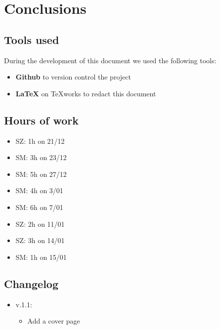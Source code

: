 \documentclass[11pt]{article} %
\begin{document}
\newpage
\section{Conclusions}

\subsection{Tools used}
During the development of this document we used the following tools:
\begin{itemize}
	\item \textbf{Github} to version control the project
	\item \textbf{\LaTeX} on TeXworks to redact this document
\end{itemize}

\subsection{Hours of work}
\begin{itemize}
	\item SZ: 1h on 21/12
	\item SM: 3h on 23/12
	\item SM: 5h on 27/12
	\item SM: 4h on 3/01
	\item SM: 6h on 7/01
	\item SZ: 2h on 11/01
	\item SZ: 3h on 14/01
	\item SM: 1h on 15/01
\end{itemize}

\subsection{Changelog}
\begin{itemize}
	\item v.1.1:
		\begin{itemize}
			\item{Add a cover page}
		\end{itemize}
\end{itemize}
\end{document}
